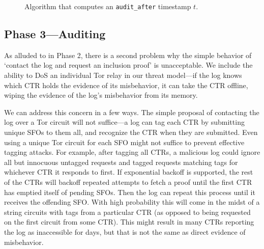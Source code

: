 
\begin{figure}
	\centering
	\caption{%
		Algorithm that computes an \texttt{audit\_after} timestamp $t$.
	}
	\label{fig:audit-after}
\end{figure}

\subsection{Phase 3---Auditing} \label{sec:base:phase3}

As alluded to in Phase 2, there is a second problem why the simple behavior of
`contact the log and request an inclusion proof' is unacceptable. We include the
ability to DoS an individual Tor relay in our threat model---if the log knows
which CTR holds the evidence of its misbehavior, it can take the CTR offline,
wiping the evidence of the log's misbehavior from its memory. 

We can address this concern in a few ways. The simple proposal of contacting the
log over a Tor circuit will not suffice---a log can tag each CTR by submitting
unique SFOs to them all, and recognize the CTR when they are submitted. Even
using a unique Tor circuit for each SFO might not suffice to prevent effective
tagging attacks. For example, after tagging all CTRs, a malicious log could
ignore all but innocuous untagged requests and tagged requests matching tags for
whichever CTR it responds to first. If exponential backoff is supported, the
rest of the CTRs will backoff repeated attempts to fetch a proof until the first
CTR has emptied itself of pending SFOs. Then the log can repeat this process
until it receives the offending SFO\@. With high probability this will come in
the midst of a string circuits with tags from a particular CTR (as opposed to
being requested on the first circuit from some CTR). This might result in many
CTRs reporting the log as inaccessible for days, but that is not the same as
direct evidence of misbehavior.

